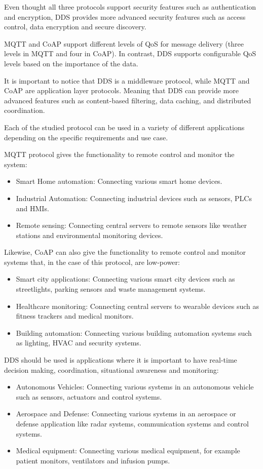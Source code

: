 Even thought all three protocols support security features such as authentication and encryption, \acs{DDS} provides more advanced security features such as access control, data encryption and secure discovery.

\acs{MQTT} and \acs{CoAP} support different levels of \ac{QoS} for message delivery (three levels in \acs{MQTT} and four in \acs{CoAP}).
In contrast, \acs{DDS} supports configurable \acs{QoS} levels based on the importance of the data.

It is important to notice that \acs{DDS} is a middleware protocol, while \acs{MQTT} and \acs{CoAP} are application layer protocols.
Meaning that \acs{DDS} can provide more advanced features such as content-based filtering, data caching, and distributed coordination.

Each of the studied protocol can be used in a variety of different applications depending on the specific requirements and use case.

\acs{MQTT} protocol gives the functionality to remote control and monitor the system:
\begin{itemize}
    \item Smart Home automation: Connecting various smart home devices.
    \item Industrial Automation: Connecting industrial devices such as sensors, PLCs and HMIs.
    \item Remote sensing: Connecting central servers to remote sensors like weather stations and environmental monitoring devices.
\end{itemize}

Likewise, \acs{CoAP} can also give the functionality to remote control and monitor systems that, in the case of this protocol, are low-power:
\begin{itemize}
    \item Smart city applications: Connecting various smart city devices such as streetlights, parking sensors and waste management systems.
    \item Healthcare monitoring: Connecting central servers to wearable devices such as fitness trackers and medical monitors.
    \item Building automation: Connecting various building automation systems such as lighting, HVAC and security systems.
\end{itemize}

\acs{DDS} should be used is applications where it is important to have real-time decision making, coordination, situational awareness and monitoring:
\begin{itemize}
    \item Autonomous Vehicles: Connecting various systems in an autonomous vehicle such as sensors, actuators and control systems.
    \item Aerospace and Defense: Connecting various systems in an aerospace or defense application like radar systems, communication systems and control systems.
    \item Medical equipment: Connecting various medical equipment, for example patient monitors, ventilators and infusion pumps.
\end{itemize}
\clearpage